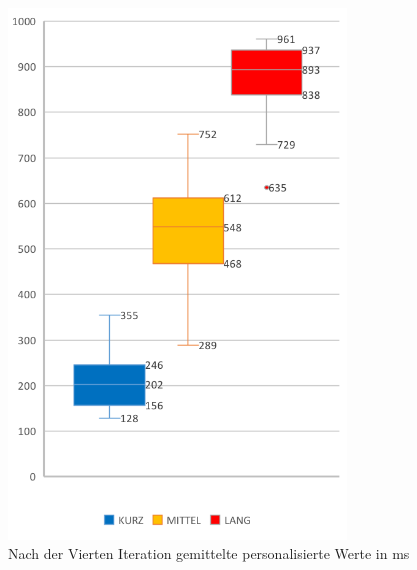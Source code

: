 \begin{figure}[htbp] 
            \centering
   	\includegraphics[width=0.8\textwidth]{pics/analyse/algo/MinMax/GrenzenNachAlgo.png}
	\caption{Nach der Vierten Iteration gemittelte personalisierte Werte in ms}
	\label{fig:GrenzenNachAlgo}
\end{figure}

